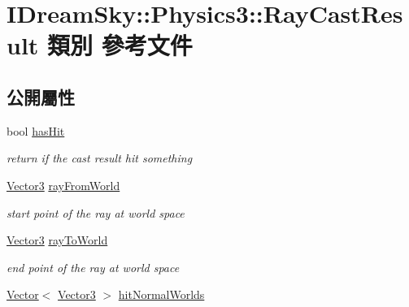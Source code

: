 \hypertarget{class_i_dream_sky_1_1_physics3_1_1_ray_cast_result}{}\section{I\+Dream\+Sky\+:\+:Physics3\+:\+:Ray\+Cast\+Result 類別 參考文件}
\label{class_i_dream_sky_1_1_physics3_1_1_ray_cast_result}
\subsection*{公開屬性}
\begin{DoxyCompactItemize}
\item 
bool \hyperlink{class_i_dream_sky_1_1_physics3_1_1_ray_cast_result_ae0f31ff5fd4347c9fa356898d36a436b}{has\+Hit}\hypertarget{class_i_dream_sky_1_1_physics3_1_1_ray_cast_result_ae0f31ff5fd4347c9fa356898d36a436b}{}\label{class_i_dream_sky_1_1_physics3_1_1_ray_cast_result_ae0f31ff5fd4347c9fa356898d36a436b}

\begin{DoxyCompactList}\small\item\em return if the cast result hit something \end{DoxyCompactList}\item 
\hyperlink{class_i_dream_sky_1_1_vector3}{Vector3} \hyperlink{class_i_dream_sky_1_1_physics3_1_1_ray_cast_result_aa55b85a393746e2b872e06f7a12d4cee}{ray\+From\+World}\hypertarget{class_i_dream_sky_1_1_physics3_1_1_ray_cast_result_aa55b85a393746e2b872e06f7a12d4cee}{}\label{class_i_dream_sky_1_1_physics3_1_1_ray_cast_result_aa55b85a393746e2b872e06f7a12d4cee}

\begin{DoxyCompactList}\small\item\em start point of the ray at world space \end{DoxyCompactList}\item 
\hyperlink{class_i_dream_sky_1_1_vector3}{Vector3} \hyperlink{class_i_dream_sky_1_1_physics3_1_1_ray_cast_result_ae9138bdc44df88caebf09897698674fa}{ray\+To\+World}\hypertarget{class_i_dream_sky_1_1_physics3_1_1_ray_cast_result_ae9138bdc44df88caebf09897698674fa}{}\label{class_i_dream_sky_1_1_physics3_1_1_ray_cast_result_ae9138bdc44df88caebf09897698674fa}

\begin{DoxyCompactList}\small\item\em end point of the ray at world space \end{DoxyCompactList}\item 
\hyperlink{class_i_dream_sky_1_1_vector}{Vector}$<$ \hyperlink{class_i_dream_sky_1_1_vector3}{Vector3} $>$ \hyperlink{class_i_dream_sky_1_1_physics3_1_1_ray_cast_result_ab921839dc22b9521bfa6ab3b53b408a5}{hit\+Normal\+Worlds}\hypertarget{class_i_dream_sky_1_1_physics3_1_1_ray_cast_result_ab921839dc22b9521bfa6ab3b53b408a5}{}\label{class_i_dream_sky_1_1_physics3_1_1_ray_cast_result_ab921839dc22b9521bfa6ab3b53b408a5}


\end{DoxyCompactItemize}
